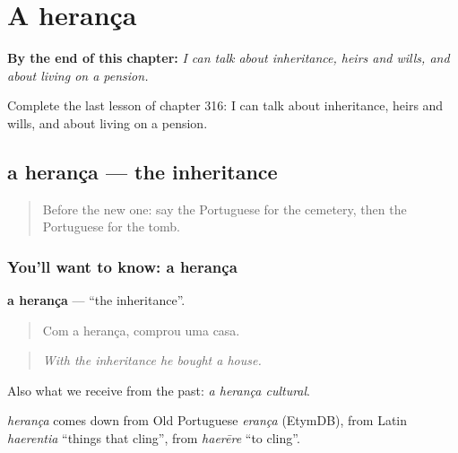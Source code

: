 
\chapter{A herança}
\label{ch:pt-a-heranca}

\begin{chapteropening}
\textbf{By the end of this chapter:} \emph{I can talk about inheritance, heirs and wills, and about living on a pension.}

Complete the last lesson of chapter 316: I can talk about inheritance, heirs and wills, and about living on a pension.
\end{chapteropening}

\section[a herança]{a herança — the inheritance}

\label{lesson:PT-C316-heranca}



\begin{quote}
Before the new one: say the Portuguese for the cemetery, then the Portuguese for the tomb.
\end{quote}

\subsection*{You'll want to know: a herança}
\textbf{a herança} — \textquotedblleft{}the inheritance\textquotedblright{}.

\begin{quote}
Com a herança, comprou uma casa.
\end{quote}

\begin{quote}
\emph{With the inheritance he bought a house.}
\end{quote}

Also what we receive from the past: \emph{a herança cultural}.

\begin{cousinweb}
\emph{herança} comes down from Old Portuguese \emph{erança} (EtymDB), from Latin \emph{haerentia} \textquotedblleft{}things that cling\textquotedblright{}, from \emph{haerēre} \textquotedblleft{}to cling\textquotedblright{}.
\end{cousinweb}

